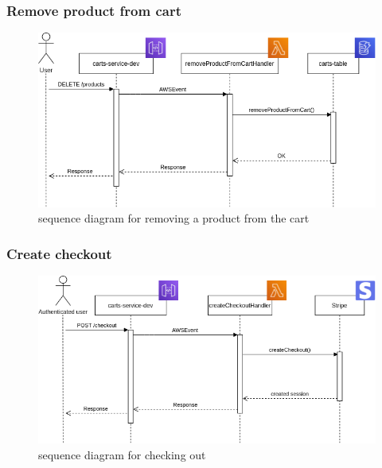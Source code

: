 \subsubsection{Remove product from cart}
\begin{figure}[!h]
    \vspace{5px}
    \includegraphics[scale=0.5]{../../../../Images/Diagrammi/maintainerManual/removeProductFromCart.png}
    \centering
    \caption{sequence diagram for removing a product from the cart} 
\end{figure}
\pagebreak
\subsubsection{Create checkout}
\begin{figure}[!h]
    \vspace{5px}
    \includegraphics[scale=0.5]{../../../../Images/Diagrammi/maintainerManual/createCheckoutSequence.png}
    \centering
    \caption{sequence diagram for checking out} 
\end{figure}
\pagebreak
